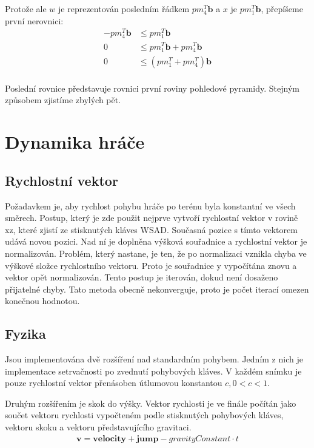 \documentclass[11pt]{article}
\begin{document}
Protože ale $w$ je reprezentován posledním řádkem $pm_4^T \mathbf{b}$ a $x$ je $pm_1^T \mathbf{b}$, přepíšeme první nerovnici:
\begin{align*}
-pm_4^T \mathbf{b} &\leq pm_1^T \mathbf{b} \\ 
0 &\leq pm_1^T \mathbf{b} + pm_4^T \mathbf{b} \\
0 &\leq (pm_1^T + pm_4^T) \mathbf{b} \\
\end{align*}

Poslední rovnice představuje rovnici první roviny pohledové pyramidy. Stejným způsobem zjistíme zbylých pět. 



\section{Dynamika hráče}
\subsection{Rychlostní vektor}
Požadavkem je, aby rychlost pohybu hráče po terénu byla konstantní ve všech
směrech. Postup, který je zde použit nejprve vytvoří rychlostní vektor v rovině
xz, které zjistí ze stisknutých kláves WSAD. Současná pozice s tímto vektorem
udává novou pozici. Nad ní je doplněna výšková souřadnice a rychlostní vektor
je normalizován. Problém, který nastane, je ten, že po normalizaci vznikla
chyba ve výškové složce rychlostního vektoru. Proto je souřadnice y vypočítána
znovu a vektor opět normalizován. Tento postup je iterován, dokud není dosaženo
přijatelné chyby. Tato metoda obecně nekonverguje, proto je počet iterací
omezen konečnou hodnotou.

\subsection{Fyzika}
Jsou implementována dvě rozšíření nad standardním pohybem. Jedním z nich je implementace setrvačnosti po zvednutí pohybových kláves. V každém snímku je pouze rychlostní vektor přenásoben útlumovou konstantou $c, 0 < c < 1$.

Druhým rozšířením je skok do výšky. Vektor rychlosti je ve finále počítán jako
součet vektoru rychlosti vypočteném podle stisknutých pohybových kláves,
vektoru skoku a vektoru představujícího gravitaci.
\begin{align*}
\mathbf{v} = \mathbf{velocity}+ \mathbf{jump} - gravityConstant \cdot t \\
\end{align*}
\end{document}
